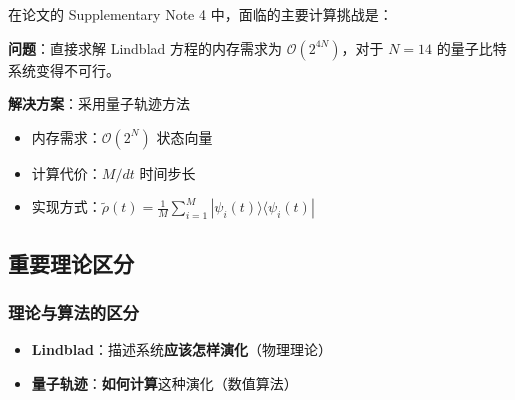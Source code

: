 \documentclass[11pt,a4paper]{article}
\begin{document}
在论文的 Supplementary Note 4 中，面临的主要计算挑战是：

\textbf{问题}：直接求解 Lindblad 方程的内存需求为 $\mathcal{O}(2^{4N})$，对于 $N=14$ 的量子比特系统变得不可行。

\textbf{解决方案}：采用量子轨迹方法
\begin{itemize}
    \item 内存需求：$\mathcal{O}(2^{N})$ 状态向量
    \item 计算代价：$M/dt$ 时间步长
    \item 实现方式：$\tilde{\rho}(t) = \frac{1}{M}\sum_{i=1}^{M} |\psi_i(t)\rangle\langle\psi_i(t)|$
\end{itemize}

        

\subsection{重要理论区分}

\subsubsection{理论与算法的区分}

\begin{itemize}
    \item \textbf{Lindblad}：描述系统\textbf{应该怎样演化}（物理理论）
    \item \textbf{量子轨迹}：\textbf{如何计算}这种演化（数值算法）
\end{itemize}
\end{document}

